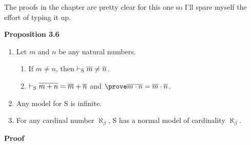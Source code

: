 The proofs in the chapter are pretty clear for this one so I'll spare myself the effort of typing it up.

\textbf{Proposition 3.6}

\begin{enumerate} [label = \alph*.]
    \item Let $m$ and $n$ be any natural numbers.
    \begin{enumerate} [label = \roman*.]
        \item If $m \not = n$, then $\vdash_\text{S} \overline{m} \not = \overline{n}$.
        \item $\vdash_\text{S} \overline{m + n} = \overline{m} + \overline{n}$ and $\prove \overline{m \cdot n} = \overline{m} \cdot \overline{n}$.
    \end{enumerate}
    \item Any model for S is infinite.
    \item For any cardinal number $\aleph_\beta$, S has a normal model of cardinality $\aleph_\beta$.
\end{enumerate}

\textbf{Proof}

